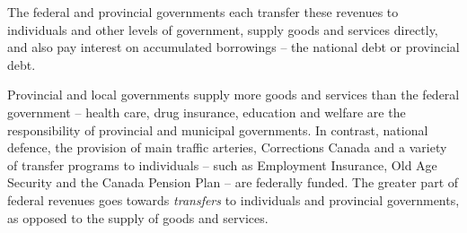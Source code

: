 



\newhtmlpage

The federal and provincial governments each transfer these revenues to
individuals and other levels of government, supply goods and services
directly, and also pay interest on accumulated borrowings -- the national
debt or provincial debt.

Provincial and local governments supply more goods and services than the
federal government -- health care, drug insurance, education and welfare are the
responsibility of provincial and municipal governments. In contrast,
national defence, the provision of main traffic arteries, Corrections Canada
and a variety of transfer programs to individuals -- such as Employment
Insurance, Old Age Security and the Canada Pension Plan -- are federally
funded. The greater part of federal revenues goes towards \textit{transfers}
to individuals and provincial governments, as opposed to the supply of goods
and services.